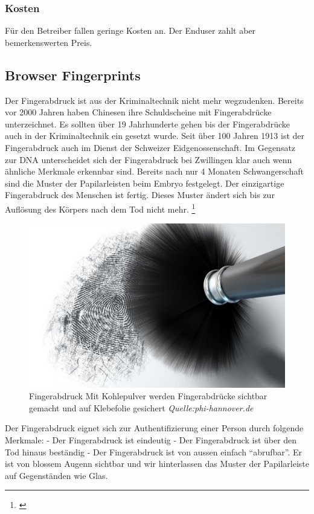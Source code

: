 \subsubsection{Kosten}\label{kosten-8}

Für den Betreiber fallen geringe Kosten an. Der Enduser zahlt aber
bemerkenswerten Preis.

\subsection{Browser Fingerprints}\label{browser-fingerprints}

Der Fingerabdruck ist aus der Kriminaltechnik nicht mehr wegzudenken.
Bereits vor 2000 Jahren haben Chinesen ihre Schuldscheine mit
Fingerabdrücke unterzeichnet. Es sollten über 19 Jahrhunderte gehen bis
der Fingerabdrücke auch in der Kriminaltechnik ein gesetzt wurde. Seit
über 100 Jahren 1913 ist der Fingerabdruck auch im Dienst der Schweizer
Eidgenossenschaft. Im Gegensatz zur DNA unterscheidet sich der
Fingerabdruck bei Zwillingen klar auch wenn ähnliche Merkmale erkennbar
sind. Bereits nach nur 4 Monaten Schwangerschaft sind die Muster der
Papilarleisten beim Embryo festgelegt. Der einzigartige Fingerabdruck
des Menschen ist fertig. Dieses Muster ändert sich bis zur Auflösung des
Körpers nach dem Tod nicht mehr. \footnote{\autocite{derfingerabdruck}}

\begin{figure}[htbp]
\centering
\includegraphics{images/fingerabdruck.jpg}
\caption{Fingerabdruck Mit Kohlepulver werden Fingerabdrücke sichtbar
gemacht und auf Klebefolie gesichert \emph{Quelle:phi-hannover.de}}
\end{figure}

Der Fingerabdruck eignet sich zur Authentifizierung einer Person durch
folgende Merkmale: - Der Fingerabdruck ist eindeutig - Der Fingerabdruck
ist über den Tod hinaus beständig - Der Fingerabdruck ist von aussen
einfach ``abrufbar''. Er ist von blossem Augenn sichtbar und wir
hinterlassen das Muster der Papilarleiste auf Gegenständen wie Glas.

